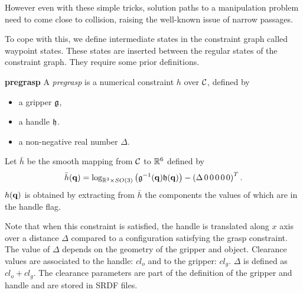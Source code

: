 However even with these simple tricks, solution paths to a manipulation problem need to come close to collision, raising the well-known issue of narrow passages.

To cope with this, we define intermediate states in the
constraint graph called waypoint states. These states are inserted
between the regular states of the constraint graph. They require some prior
definitions.

\begin{definition}\label{def:pregrasp}\textbf{pregrasp}
  A \emph{pregrasp} is a numerical constraint $h$ over $\mathcal{C}$, defined by
  \begin{itemize}
  \item a gripper $\mathfrak{g}$,
  \item a handle $\mathfrak{h}$.
  \item a non-negative real number $\Delta$.
  \end{itemize}
  Let $\bar{h}$ be the smooth mapping from $\mathcal{C}$ to $\mathbb{R}^6$ defined by
  \begin{equation}\label{eq:barh-pregrasp}
    \bar{h}(\conf) = \log_{\reals^3\times SO(3)}\left(\gripper^{-1}(\conf) \handle(\conf)\right) - \left(\Delta\, 0\, 0\, 0\, 0\, 0\right)^T.
  \end{equation}
  $h(\mathbf{q})$ is obtained by extracting from $\bar{h}$ the components the values of which are \true in the handle flag.
\end{definition}
Note that when this constraint is satisfied, the handle is translated
along $x$ axis over a distance $\Delta$ compared to a configuration
satisfying the grasp constraint. The value of $\Delta$ depends on the geometry
of the gripper and object. Clearance values are associated to the handle: $cl_{o}$ and to the gripper: $cl_{g}$. $\Delta$ is defined as $cl_{o}+cl_{g}$. The
clearance parameters are part of the definition of the gripper and handle and
are stored in SRDF files.

